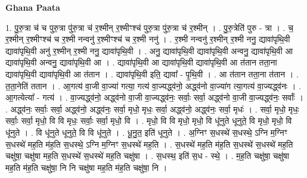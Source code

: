 \documentclass[17pt]{extarticle}
\begin{document}
\textbf{Ghana Paata } \newline

1. पु॒रु॒त्रा च॑ च पुरु॒त्रा पु॑रु॒त्रा च॑ र॒श्मीन् र॒श्मीꣳश्च॑ पुरु॒त्रा पु॑रु॒त्रा च॑ र॒श्मीन् । . पु॒रु॒त्रेति॑ पुरु - त्रा । . च॒ र॒श्मीन् र॒श्मीꣳश्च॑ च र॒श्मी नन्वनु॑ र॒श्मीꣳश्च॑ च र॒श्मी ननु॑ । . र॒श्मी नन्वनु॑ र॒श्मीन् र॒श्मी ननु॒ द्यावा॑पृथि॒वी द्यावा॑पृथि॒वी अनु॑ र॒श्मीन् र॒श्मी ननु॒ द्यावा॑पृथि॒वी । . अनु॒ द्यावा॑पृथि॒वी द्यावा॑पृथि॒वी अन्वनु॒ द्यावा॑पृथि॒वी आ द्यावा॑पृथि॒वी अन्वनु॒ द्यावा॑पृथि॒वी आ । . द्यावा॑पृथि॒वी आ द्यावा॑पृथि॒वी द्यावा॑पृथि॒वी आ त॑तान तता॒ना द्यावा॑पृथि॒वी द्यावा॑पृथि॒वी आ त॑तान । . द्यावा॑पृथि॒वी इति॒ द्यावा᳚ - पृ॒थि॒वी । . आ त॑तान तता॒ना त॑तान । . त॒ता॒नेति॑ ततान । . आ॒गत्य॑ वा॒जी वा॒ज्या॑ गत्या॒ गत्य॑ वा॒ज्यद्ध्व॑नो॒ अद्ध्व॑नो वा॒ज्या॑ग त्या॒गत्य॑ वा॒ज्यद्ध्व॑नः । . आ॒गत्येत्या᳚ - गत्य॑ । . वा॒ज्यद्ध्व॑नो॒ अद्ध्व॑नो वा॒जी वा॒ज्यद्ध्व॑नः॒ सर्वाः॒ सर्वा॒ अद्ध्व॑नो वा॒जी वा॒ज्यद्ध्व॑नः॒ सर्वाः᳚ । . अद्ध्व॑नः॒ सर्वाः॒ सर्वा॒ अद्ध्व॑नो॒ अद्ध्व॑नः॒ सर्वा॒ मृधो॒ मृधः॒ सर्वा॒ अद्ध्व॑नो॒ अद्ध्व॑नः॒ सर्वा॒ मृधः॑ । . सर्वा॒ मृधो॒ मृधः॒ सर्वाः॒ सर्वा॒ मृधो॒ वि वि मृधः॒ सर्वाः॒ सर्वा॒ मृधो॒ वि । . मृधो॒ वि वि मृधो॒ मृधो॒ वि धू॑नुते धूनुते॒ वि मृधो॒ मृधो॒ वि धू॑नुते । . वि धू॑नुते धूनुते॒ वि वि धू॑नुते । . धू॒नु॒त॒ इति॑ धूनुते । . अ॒ग्निꣳ स॒धस्थे॑ स॒धस्थे॒ ऽग्नि म॒ग्निꣳ स॒धस्थे॑ मह॒ति म॑ह॒ति स॒धस्थे॒ ऽग्नि म॒ग्निꣳ स॒धस्थे॑ मह॒ति । . स॒धस्थे॑ मह॒ति म॑ह॒ति स॒धस्थे॑ स॒धस्थे॑ मह॒ति चक्षु॑षा॒ चक्षु॑षा मह॒ति स॒धस्थे॑ स॒धस्थे॑ मह॒ति चक्षु॑षा । . स॒धस्थ॒ इति॑ स॒ध - स्थे॒ । . म॒ह॒ति चक्षु॑षा॒ चक्षु॑षा मह॒ति म॑ह॒ति चक्षु॑षा॒ नि नि चक्षु॑षा मह॒ति म॑ह॒ति चक्षु॑षा॒ नि । \newline
\end{document}
